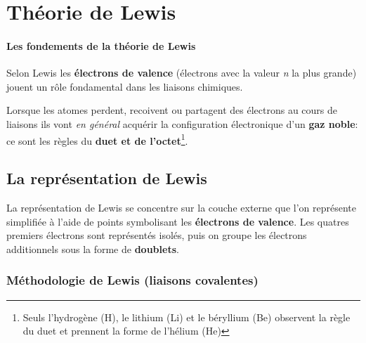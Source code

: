 \documentclass[10pt,a4paper]{book}
\begin{document}
\section{Théorie de Lewis}

\paragraph{Les fondements de la théorie de Lewis} Selon Lewis les \textbf{électrons de valence} (électrons avec la valeur \textit{n} la plus grande) jouent un rôle fondamental dans les liaisons chimiques. \par
Lorsque les atomes perdent, recoivent ou partagent des électrons au cours de liaisons ils vont \textit{en général} acquérir la configuration électronique d'un \textbf{gaz noble}: ce sont les règles du \textbf{duet et de l'octet}\footnote{Seuls l'hydrogène (H), le lithium (Li) et le béryllium (Be) observent la règle du duet et prennent la forme de l'hélium (He)}.

\subsection{La représentation de Lewis}

La représentation de Lewis se concentre sur la couche externe que l'on représente simplifiée à l'aide de points symbolisant les \textbf{électrons de valence}. Les quatres premiers électrons sont représentés isolés, puis on groupe les électrons additionnels sous la forme de \textbf{doublets}.

\subsubsection{Méthodologie de Lewis (liaisons covalentes)}
\end{document}
